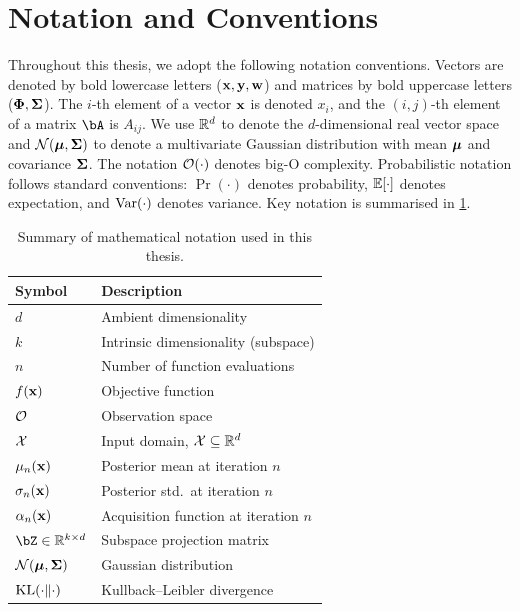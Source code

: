 \section{Notation and Conventions}
\label{sec:notation}

Throughout this thesis, we adopt the following notation conventions.  Vectors
are denoted by bold lowercase letters ($\mathbf{x}, \mathbf{y}, \mathbf{w}$) and matrices by bold
uppercase letters ($\boldsymbol{\Phi}, \boldsymbol{\Sigma}$).  The $i$-th element of a vector $\mathbf{x}$ is
denoted $x_i$, and the $(i,j)$-th element of a matrix $\bA$ is $A_{ij}$.  We
use $\mathbb{R}^d$ to denote the $d$-dimensional real vector space and $\mathcal{N}(\boldsymbol{\mu}, \boldsymbol{\Sigma})$
to denote a multivariate Gaussian distribution with mean $\boldsymbol{\mu}$ and covariance
$\boldsymbol{\Sigma}$.  The notation $\mathcal{O}(\cdot)$ denotes big-O complexity.  Probabilistic
notation follows standard conventions: $\Pr(\cdot)$ denotes probability,
$\operatorname{\mathbb{E}}[\cdot]$ denotes expectation, and $\operatorname{Var}(\cdot)$ denotes variance.  Key
notation is summarised in \cref{tab:notation}.

\begin{table}[htbp]
    \centering
    \caption{Summary of mathematical notation used in this thesis.}
    \label{tab:notation}
    \begin{tabular}{@{}ll@{}}
        \toprule
        \textbf{Symbol} & \textbf{Description} \\
        \midrule
        $d$ & Ambient dimensionality \\
        $k$ & Intrinsic dimensionality (subspace) \\
        $n$ & Number of function evaluations \\
        $f(\mathbf{x})$ & Objective function \\
        $\mathcal{O}$ & Observation space \\
        $\mathcal{X}$ & Input domain, $\mathcal{X} \subseteq \mathbb{R}^d$ \\
        $\mu_n(\mathbf{x})$ & Posterior mean at iteration $n$ \\
        $\sigma_n(\mathbf{x})$ & Posterior std.\ at iteration $n$ \\
        $\alpha_n(\mathbf{x})$ & Acquisition function at iteration $n$ \\
        $\bZ \in \R^{k \times d}$ & Subspace projection matrix \\
        $\mathcal{N}(\boldsymbol{\mu}, \boldsymbol{\Sigma})$ & Gaussian distribution \\
        $\operatorname{KL}(\cdot \| \cdot)$ & Kullback--Leibler divergence \\
        \bottomrule
    \end{tabular}
\end{table}

